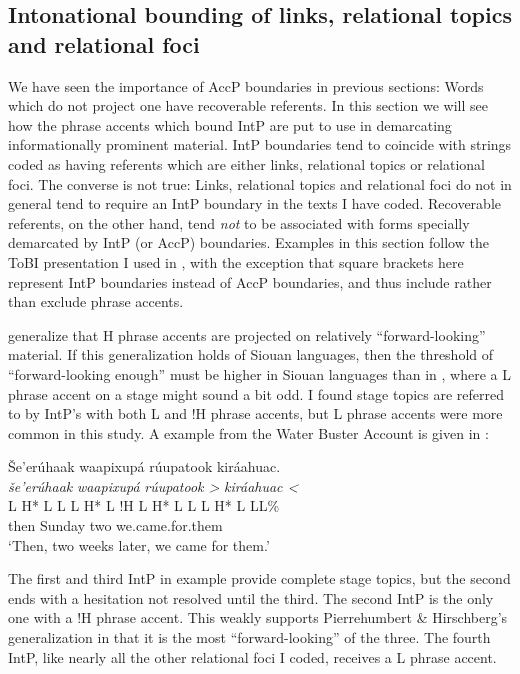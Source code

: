 \documentclass[output=paper]{LSP/langsci}
\begin{document}
\subsection{Intonational bounding of links, relational topics and relational foci}\label{intonationalbounding}
	
	We have seen the importance of AccP boundaries in previous sections: Words which do not project one have recoverable referents. In this section we will see how the phrase accents which bound IntP are put to use in demarcating informationally prominent material. IntP boundaries tend to coincide with strings coded as having referents which are either links, relational topics or relational foci. The converse is not true: Links, relational topics and relational foci do not in general tend to require an IntP boundary in the texts I have coded. Recoverable referents, on the other hand, tend \emph{not} to be associated with forms specially demarcated by IntP (or AccP) boundaries. Examples in this section follow the ToBI presentation I used in , with the exception that square brackets here represent IntP boundaries instead of AccP boundaries, and thus include rather than exclude phrase accents.
	
	\citet{PierrehumbertHirschberg1990} generalize that H phrase accents are projected on relatively “forward-looking” material. If this generalization holds of Siouan languages, then the threshold of “forward-looking enough” must be higher in Siouan languages than in , where a L phrase accent on a stage  might sound a bit odd. I found stage topics are referred to by IntP’s with both L and !H phrase accents, but L phrase accents were more common in this study. A  example from the Water Buster Account is given in :
	
\ea\label{waterbusterstagetopic}
Še’erúhaak waapixupá rúupatook kiráahuac.\footnotemark\\
\glll	\emph{še’erúhaak}		\emph{waapixupá}		\emph{rúupatook >	}	\emph{kiráahuac <}\\
	{\ob L H* L L\cb}		{\ob L H* L !H\cb}		{\ob L H* L L\cb}		{\ob L H* L L\cb{}L\%}\\
	then				Sunday			two				we.came.for.them\\
\glt	`Then, two weeks later, we came for them.'
\z

The first and third IntP in example  provide complete stage topics, but the second ends with a hesitation not resolved until the third. The second IntP is the only one with a !H phrase accent. This weakly supports Pierrehumbert \& Hirschberg’s generalization in that it is the most “forward-looking” of the three. The fourth IntP, like nearly all the other relational foci I coded, receives a L phrase accent.
\end{document}
